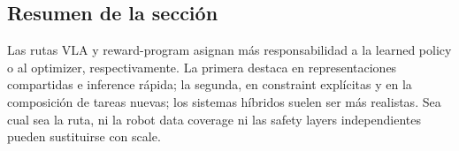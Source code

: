 
\subsection{Resumen de la sección}

Las rutas VLA y reward-program asignan más responsabilidad a la learned policy o al optimizer, respectivamente. La primera destaca en representaciones compartidas e inference rápida; la segunda, en constraint explícitas y en la composición de tareas nuevas; los sistemas híbridos suelen ser más realistas. Sea cual sea la ruta, ni la robot data coverage ni las safety layers independientes pueden sustituirse con scale.
